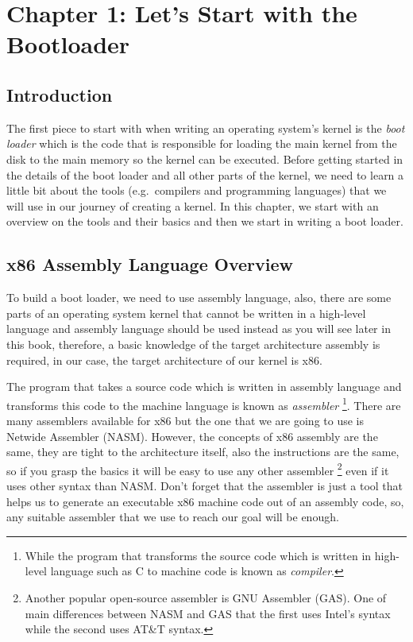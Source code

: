 \chapter{Chapter 1: Let's Start with the
Bootloader}\label{ch-bootloader}

\section{Introduction}\label{introduction}

The first piece to start with when writing an operating system's kernel
is the \emph{boot loader} which is the code that is responsible for
loading the main kernel from the disk to the main memory so the kernel
can be executed. Before getting started in the details of the boot
loader and all other parts of the kernel, we need to learn a little bit
about the tools (e.g.~compilers and programming languages) that we will
use in our journey of creating a kernel. In this chapter, we start with
an overview on the tools and their basics and then we start in writing a
boot loader.

\section{x86 Assembly Language
Overview}\label{x86-assembly-language-overview}

To build a boot loader, we need to use assembly language, also, there
are some parts of an operating system kernel that cannot be written in a
high-level language and assembly language should be used instead as you
will see later in this book, therefore, a basic knowledge of the target
architecture assembly is required, in our case, the target architecture
of our kernel is x86.

The program that takes a source code which is written in assembly
language and transforms this code to the machine language is known as
\emph{assembler} \footnote{While the program that transforms the source
  code which is written in high-level language such as C to machine code
  is known as \emph{compiler}.}. There are many assemblers available for
x86 but the one that we are going to use is Netwide Assembler (NASM).
However, the concepts of x86 assembly are the same, they are tight to
the architecture itself, also the instructions are the same, so if you
grasp the basics it will be easy to use any other assembler \footnote{Another
  popular open-source assembler is GNU Assembler (GAS). One of main
  differences between NASM and GAS that the first uses Intel's syntax
  while the second uses AT\&T syntax.} even if it uses other syntax than
NASM. Don't forget that the assembler is just a tool that helps us to
generate an executable x86 machine code out of an assembly code, so, any
suitable assembler that we use to reach our goal will be enough.

